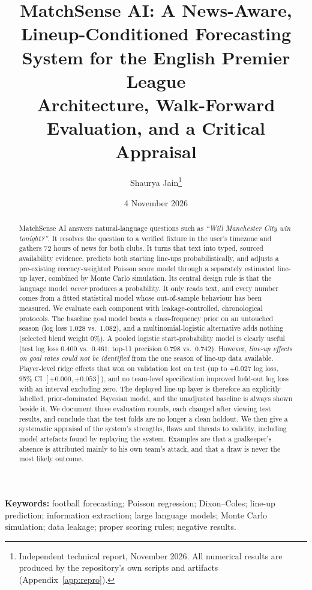 \documentclass[11pt,a4paper]{article}
\title{\textbf{MatchSense AI}: A News-Aware, Lineup-Conditioned Forecasting
System for the English Premier League\\[4pt]
\large Architecture, Walk-Forward Evaluation, and a Critical Appraisal}
\author{Shaurya Jain\thanks{Independent technical report, November 2026.
All numerical results are produced by the repository's own scripts and
artifacts (Appendix~\ref{app:repro}).}}
\date{4 November 2026}
\begin{document}
\maketitle

\begin{abstract}
\noindent
MatchSense AI answers natural-language questions such as \emph{``Will
Manchester City win tonight?''}. It resolves the question to a verified fixture
in the user's timezone and gathers 72 hours of news for both clubs. It turns
that text into typed, sourced availability evidence, predicts both starting
line-ups probabilistically, and adjusts a pre-existing recency-weighted Poisson
score model through a separately estimated line-up layer, combined by Monte
Carlo simulation. Its central design rule is that the language model
\emph{never} produces a probability. It only reads text, and every number comes
from a fitted statistical model whose out-of-sample behaviour has been measured.
We evaluate each component with leakage-controlled, chronological protocols.
The baseline goal model beats a class-frequency prior on an untouched season
(log loss $1.028$ vs.\ $1.082$), and a multinomial-logistic alternative adds
nothing (selected blend weight $0\%$). A pooled logistic start-probability model
is clearly useful (test log loss $0.400$ vs.\ $0.461$; top-11 precision $0.798$
vs.\ $0.742$). However, \emph{line-up effects on goal rates could not be
identified} from the one season of line-up data available. Player-level ridge
effects that won on validation lost on test (up to $+0.027$ log loss, 95\% CI
$[+0.000,+0.053]$), and no team-level specification improved held-out log loss
with an interval excluding zero. The deployed line-up layer is therefore an
explicitly labelled, prior-dominated Bayesian model, and the unadjusted baseline
is always shown beside it. We document three evaluation rounds, each changed
after viewing test results, and conclude that the test folds are no longer a
clean holdout. We then give a systematic appraisal of the system's strengths,
flaws and threats to validity, including model artefacts found by replaying the
system. Examples are that a goalkeeper's absence is attributed mainly to his own
team's attack, and that a draw is never the most likely outcome.
\end{abstract}
\newpage

\noindent\textbf{Keywords:} football forecasting; Poisson regression;
Dixon--Coles; line-up prediction; information extraction; large language
models; Monte Carlo simulation; data leakage; proper scoring rules; negative
results.
\end{document}

